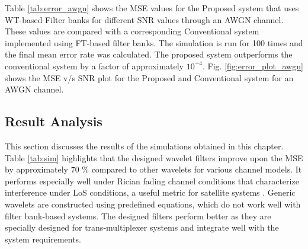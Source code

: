 \documentclass[conference]{IEEEtran}
\begin{document}
\begin{table}[htpb]
    \centering
    \caption{Mean Error Rate of the System for AWGN Channel.}
    \label{tab:error_awgn}
\end{table}

Table \ref{tab:error_awgn} shows the MSE values for the Proposed system that uses WT-based Filter banks for different SNR values through an AWGN channel. These values are compared with a corresponding Conventional system implemented using FT-based filter banks. The simulation is run for 100 times and the final mean error rate was calculated. The proposed system outperforms the conventional system by a factor of approximately $10^{-4}$. Fig. \ref{fig:error_plot_awgn} shows the MSE v/s SNR plot for the Proposed and Conventional system for an AWGN channel.


\subsection{Result Analysis}
This section discusses the results of the simulations obtained in this chapter. Table \ref{tab:sim} highlights that the designed wavelet filters improve upon the MSE by approximately 70 \% compared to other wavelets for various channel models. It performs especially well under Rician fading channel conditions that characterize interference under LoS conditions, a useful metric for satellite systems \cite{channel}. Generic wavelets are constructed using predefined equations, which do not work well with filter bank-based systems. The designed filters perform better as they are specially designed for trans-multiplexer systems and integrate well with the system requirements. 
\end{document}
